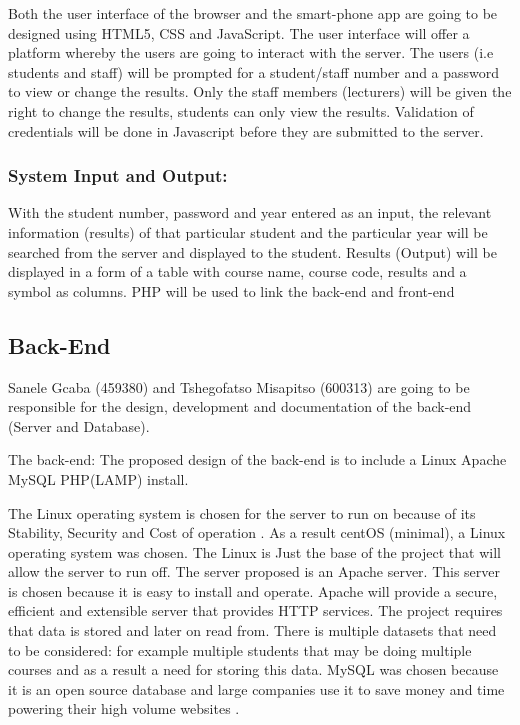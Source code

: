 \documentclass[10pt,onecolumn]{RequimentsGathering}
\begin{document}
Both the user interface of the browser and the smart-phone app are going to be designed using HTML5, CSS and JavaScript. The user interface will offer a platform whereby the users are going to interact with the server. The users (i.e students and staff) will be prompted for a student/staff number and a password to view or change the results. Only the staff members (lecturers) will be given the right to change the results, students can only view the results. Validation of credentials will be done in Javascript before they are submitted to the server.  

\subsubsection{\textbf{System Input and Output:}} 
 
With the student number, password and year entered as an input, the relevant information (results) of that particular student and the particular year will be searched from the server and displayed to the student. Results (Output) will be displayed in a form of a table with course name, course code, results and a symbol as columns. PHP will be used to link the back-end and front-end

\subsection{Back-End}
Sanele Gcaba (459380) and Tshegofatso Misapitso (600313)  are going to be responsible for the design, development and documentation of the back-end (Server and Database).

The back-end:
The proposed design of the back-end is to include a Linux Apache MySQL PHP(LAMP) install.

The Linux operating system is chosen for the server to run on because of its Stability, Security and Cost of operation \cite{ref1}.   
As a result centOS (minimal), a Linux operating system was chosen.
The Linux is Just the base of the project that will allow the server to run off. The server proposed is an Apache server. This server is chosen because it is easy to install and operate. Apache will provide a secure, efficient and extensible server that provides HTTP services.
The project requires that data is stored and later on read from. There is multiple datasets that need to be considered: for example multiple students that may be doing multiple courses and as a result a need for storing this data. MySQL was chosen because it is an open source database and large companies use it to save money and time powering their high volume websites \cite{ref2}.
\end{document}
